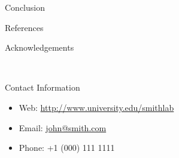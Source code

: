 \documentclass[final]{beamer}
\newlength{\onecolwid}
\begin{document}
\begin{frame}[t]
\begin{columns}[t]
\begin{column}{\onecolwid}
\begin{alertblock}{Conclusion}
\end{alertblock}


\begin{block}{References}

\nocite{*} %
\small{
\vspace{0.75in}}

\end{block}



\begin{block}{Acknowledgements}

\small{} \\

\end{block}



\begin{alertblock}{Contact Information}

\begin{itemize}
\item Web: \href{http://www.university.edu/smithlab}{http://www.university.edu/smithlab}
\item Email: \href{mailto:john@smith.com}{john@smith.com}
\item Phone: +1 (000) 111 1111
\end{itemize}

\end{alertblock}



\end{column} %
\end{columns} %
\end{frame} %
\end{document}
